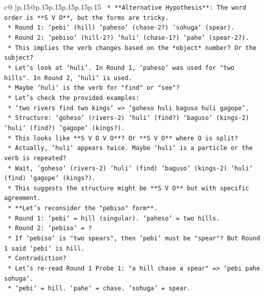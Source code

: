 \documentclass{article}
\begin{document}
{\begin{supertabular}{c@{$\;$}|p{.15\linewidth}@{}p{.15\linewidth}p{.15\linewidth}p{.15\linewidth}p{.15\linewidth}p{.15\linewidth}}
{{{\texttt{    *   **Alternative Hypothesis**: The word order is **S V O**, but the forms are tricky.} \\
\texttt{        *   Round 1: `pebi` (hill) `paheso` (chase{-}2?) `sohuga` (spear).} \\
\texttt{        *   Round 2: `pebiso` (hill{-}2?) `huli` (chase{-}1?) `pahe` (spear{-}2?).} \\
\texttt{        *   This implies the verb changes based on the *object* number? Or the subject?} \\
\texttt{        *   Let's look at `huli`. In Round 1, `paheso` was used for "two hills". In Round 2, `huli` is used.} \\
\texttt{        *   Maybe `huli` is the verb for "find" or "see"?} \\
\texttt{        *   Let's check the provided examples:} \\
\texttt{            *   `two rivers find two kings` => `goheso huli baguso huli gagope`.} \\
\texttt{                *   Structure: `goheso` (rivers{-}2) `huli` (find?) `baguso` (kings{-}2) `huli` (find?) `gagope` (kings?).} \\
\texttt{                *   This looks like **S V O V O**? Or **S V O** where O is split?} \\
\texttt{                *   Actually, `huli` appears twice. Maybe `huli` is a particle or the verb is repeated?} \\
\texttt{                *   Wait, `goheso` (rivers{-}2) `huli` (find) `baguso` (kings{-}2) `huli` (find) `gagope` (kings?).} \\
\texttt{                *   This suggests the structure might be **S V O** but with specific agreement.} \\
\texttt{    *   **Let's reconsider the "pebiso" form**.} \\
\texttt{        *   Round 1: `pebi` = hill (singular). `paheso` = two hills.} \\
\texttt{        *   Round 2: `pebiso` = ?} \\
\texttt{        *   If `pebiso` is "two spears", then `pebi` must be "spear"? But Round 1 said `pebi` is hill.} \\
\texttt{        *   Contradiction?} \\
\texttt{        *   Let's re{-}read Round 1 Probe 1: "a hill chase a spear" => `pebi pahe sohuga`.} \\
\texttt{            *   `pebi` = hill. `pahe` = chase. `sohuga` = spear.} \\
}}}
\end{supertabular}}
\end{document}
